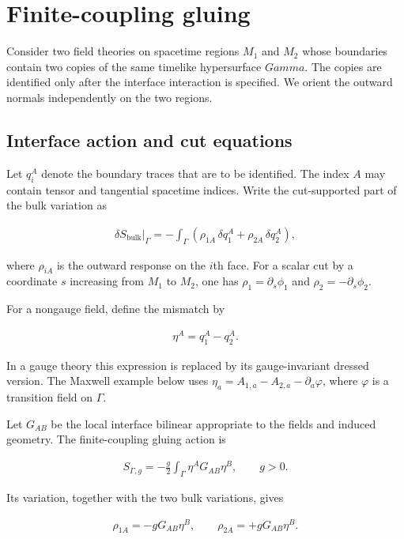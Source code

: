 \section{Finite-coupling gluing}\label{sec:gluing-formalism}

Consider two field theories on spacetime regions $M_1$ and $M_2$ whose boundaries contain two copies of the same timelike hypersurface $Gamma$. The copies are identified only after the interface interaction is specified. We orient the outward normals independently on the two regions.

\subsection{Interface action and cut equations}\label{subsec:interface-action}

Let $q_i^A$ denote the boundary traces that are to be identified. The index $A$ may contain tensor and tangential spacetime indices. Write the cut-supported part of the bulk variation as

\begin{align}
\delta S_{\mathrm{bulk}}\big|_{\Gamma}
=-\int_{\Gamma}\left(\rho_{1A}\,\delta q_1^A+\rho_{2A}\,\delta q_2^A\right),
\end{align}

where $\rho_{iA}$ is the outward response on the $i$th face. For a scalar cut by a coordinate $s$ increasing from $M_1$ to $M_2$, one has $\rho_1=\partial_s\phi_1$ and $\rho_2=-\partial_s\phi_2$.

For a nongauge field, define the mismatch by

\begin{align}
\eta^A=q_1^A-q_2^A.
\end{align}

In a gauge theory this expression is replaced by its gauge-invariant dressed version. The Maxwell example below uses $\eta_a=A_{1,a}-A_{2,a}-\partial_a\varphi$, where $\varphi$ is a transition field on $\Gamma$.

Let $G_{AB}$ be the local interface bilinear appropriate to the fields and induced geometry. The finite-coupling gluing action is

\begin{align}
S_{\Gamma,g}=-\frac{g}{2}\int_{\Gamma}\eta^A G_{AB}\eta^B,
\qquad g>0.
\end{align}

Its variation, together with the two bulk variations, gives

\begin{align}
\rho_{1A}=-gG_{AB}\eta^B,
\qquad
\rho_{2A}=+gG_{AB}\eta^B.
\end{align}

